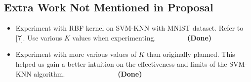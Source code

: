 \documentclass[11pt,letterpaper]{article}
\begin{document}
\subsection{Extra Work Not Mentioned in Proposal}

\begin{itemize}
\item Experiment with RBF kernel on SVM-KNN with MNIST dataset. Refer to [7]. Use various $K$ values when experimenting. $\>\>\>\>\>\>\>\>\>\>\>\>\>\>\>\>\>\>\>$\textbf{(Done)}

\item Experiment with more various values of $K$ than originally planned. This helped us gain a better intuition on the effectiveness and limits of the SVM-KNN algorithm. $\>\>\>\>\>\>\>\>\>\>\>\>\>\>\>\>\>\>\>\>\>\>\>\>\>\>\>\>\>\>\>\>\>$\textbf{(Done)}

\end{itemize}
\end{document}
